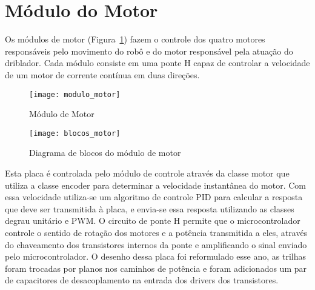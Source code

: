 \section{Módulo do Motor}\label{sec:modulo_motor}

Os módulos de motor (Figura~\ref{fig:modulo_motor}) fazem o controle dos quatro motores responsáveis pelo movimento do robô e do motor responsável pela atuação do driblador. Cada módulo consiste em uma ponte H capaz de controlar a velocidade de um motor de corrente contínua em duas direções. 

\begin{figure}
	\centering
	\texttt{[image: modulo\_motor]}
	\caption{Módulo de Motor}
	\label{fig:modulo_motor}
\end{figure}

\begin{figure}
	\centering
	\texttt{[image: blocos\_motor]}
	\caption{Diagrama de blocos do módulo de motor}
	\label{fig:blocos_motor}
\end{figure}

Esta placa é controlada pelo módulo de controle através da classe motor que utiliza a classe encoder para determinar a velocidade instantânea do motor. Com essa velocidade utiliza-se um algoritmo de controle PID para calcular a resposta que deve ser transmitida à placa, e envia-se essa resposta utilizando as classes degrau unitário e PWM.
O circuito de ponte H permite que o microcontrolador controle o sentido de rotação dos motores e a potência transmitida a eles, através do chaveamento dos transistores internos da ponte e amplificando o sinal enviado pelo microcontrolador.
O desenho dessa placa foi reformulado esse ano, as trilhas foram trocadas por planos nos caminhos de potência e foram adicionados um par de capacitores de desacoplamento na entrada dos drivers dos transistores.


